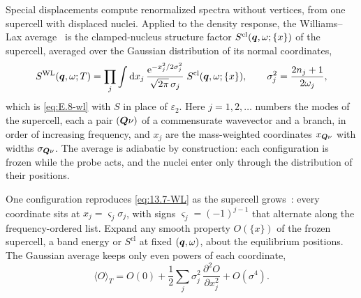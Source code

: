 Special displacements compute renormalized spectra without vertices, from one supercell with displaced nuclei. Applied to the density response, the Williams--Lax average~\cites{lax1952franck}[Eqs.~(1) and~(3)]{zacharias2016one} is the clamped-nucleus structure factor $S^{\mathrm{cl}}(\bm{q},\omega;\{x\})$ of the supercell, averaged over the Gaussian distribution of its normal coordinates,
\begin{equation}
  S^{\mathrm{WL}}(\bm{q},\omega;T) = \prod_j\int\mathrm{d} x_j\,\frac{\mathrm{e}^{-x_j^2/2\sigma_j^2}}{\sqrt{2\pi}\,\sigma_j}\;S^{\mathrm{cl}}(\bm{q},\omega;\{x\}) ,
  \qquad \sigma_j^2 = \frac{2n_j + 1}{2\omega_j} ,
  \label{eq:13.7-WL}
\end{equation}
which is \cref{eq:E.8-wl} with $S$ in place of $\varepsilon_2$. Here $j = 1, 2, \ldots$ numbers the modes of the supercell, each a pair $(\bm{Q}\nu)$ of a commensurate wavevector and a branch, in order of increasing frequency, and $x_j$ are the mass-weighted coordinates $x_{\bm{Q}\nu}$ with widths $\sigma_{\bm{Q}\nu}$. The average is adiabatic by construction: each configuration is frozen while the probe acts, and the nuclei enter only through the distribution of their positions.

One configuration reproduces \cref{eq:13.7-WL} as the supercell grows~\cite[Sect.~III\,A]{zacharias2016one}: every coordinate sits at $x_j = \varsigma_j\sigma_j$, with signs $\varsigma_j = (-1)^{j-1}$ that alternate along the frequency-ordered list. Expand any smooth property $O(\{x\})$ of the frozen supercell, a band energy or $S^{\mathrm{cl}}$ at fixed $(\bm{q},\omega)$, about the equilibrium positions. The Gaussian average keeps only even powers of each coordinate,
\begin{equation*}
  \langle O\rangle_T = O(0) + \frac12\sum_j\sigma_j^2\,\frac{\partial^2O}{\partial x_j^2} + O(\sigma^4) .
\end{equation*}

